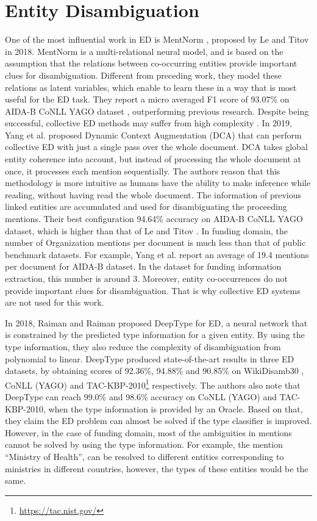\documentclass{report}
\theoremstyle{definition}
\theoremstyle{remark}
\begin{document}
\section{Entity Disambiguation}
\label{sota2}

One of the most influential work in ED is MentNorm \cite{mentnorm}, proposed by Le and Titov in 2018. MentNorm is a multi-relational neural model, and is based on the assumption that the relations between co-occurring entities provide important clues for disambiguation. Different from preceding work, they model these relations as latent variables, which enable to learn these in a way that is most useful for the ED task. They report a micro averaged F1 score of 93.07\% on AIDA-B CoNLL YAGO dataset \cite{CoNLLYago}, outperforming previous research. Despite being successful, collective ED methods may suffer from high complexity \cite{dca}. In 2019, Yang et al. \cite{dca} proposed Dynamic Context Augmentation (DCA) that can perform collective ED with just a single pass over the whole document. DCA takes global entity coherence into account, but instead of processing the whole document at once, it processes each mention sequentially. The authors reason that this methodology is more intuitive as humans have the ability to make inference while reading, without having read the whole document. The information of previous linked entities are accumulated and used for disambiguating the proceeding mentions. Their best configuration 94.64\% accuracy on AIDA-B CoNLL YAGO dataset, which is higher than that of Le and Titov \cite{mentnorm}. In funding domain, the number of Organization mentions per document is much less than that of public benchmark datasets. For example, Yang et al. \cite{dca} report an average of 19.4 mentions per document for AIDA-B dataset. In the dataset for funding information extraction, this number is around 3. Moreover, entity co-occurrences do not provide important clues for disambiguation. That is why collective ED systems are not used for this work.

In 2018, Raiman and Raiman proposed DeepType \cite{raiman} for ED, a neural network that is constrained by the predicted type information for a given entity. By using the type information, they also reduce the complexity of disambiguation from polynomial to linear. DeepType produced state-of-the-art results in three ED datasets, by obtaining scores of 92.36\%, 94.88\% and 90.85\% on WikiDisamb30 \cite{wikidisamb}, CoNLL (YAGO) \cite{CoNLLYago} and TAC-KBP-2010\footnote{\url{https://tac.nist.gov/}} respectively. The authors also note that DeepType can reach 99.0\% and 98.6\% accuracy on CoNLL (YAGO) and TAC-KBP-2010, when the type information is provided by an Oracle. Based on that, they claim the ED problem can almost be solved if the type classifier is improved. However, in the case of funding domain, most of the ambiguities in mentions cannot be solved by using the type information. For example, the mention ``Ministry of Health'', can be resolved to different entities corresponding to ministries in different countries, however,  the types of these entities would be the same.
\end{document}

